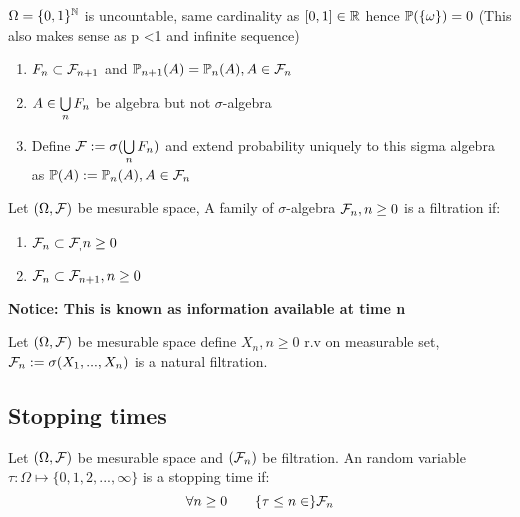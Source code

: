 \begin{rem}
$\Omega = \{0,1\}^{\mathbb{N}}$ is uncountable, same cardinality as $[0,1]\in\mathbb{R}$ hence $\mathbb{P}(\{\omega\}) = 0$ (This also makes sense as p <1 and infinite sequence)
\begin{enumerate}
    \item $F_n \subset \mathcal{F}_{n+1}$ and $\mathbb{P}_{n+1}(A)= \mathbb{P}_n(A), A\in \mathcal{F}_n$
    \item $A\in\bigcup\limits_{n}F_n$ be algebra but not $\sigma$-algebra
    \item Define $\mathcal{F} := \sigma(\bigcup\limits_{n}F_n)$ and extend probability uniquely to this sigma algebra as $\mathbb{P}(A) := \mathbb{P}_n(A), A\in\mathcal{F}_n$
\end{enumerate}
\end{rem}
\vspace{2cm}
\begin{dfn}[Filtration] Let $(\Omega, \mathcal{F})$ be mesurable space, A family of $\sigma$-algebra $\mathcal{F}_n, n\geq 0$ is a filtration if:
\begin{enumerate}
    \item $\mathcal{F}_n\subset\mathcal{F}_, n\geq 0$
    \item $\mathcal{F}_n \subset \mathcal{F}_{n+1}, n\geq 0$
\end{enumerate}
\end{dfn}
\textbf{Notice: This is known as information available at time n}
\begin{example}
Let $(\Omega, \mathcal{F})$ be mesurable space define $X_n, n\geq 0$ r.v on measurable set, $\mathcal{F}_n := \sigma(X_1, ..., X_n)$ is a natural filtration.
\end{example}

\newpage
\subsection*{Stopping times}
\begin{dfn}
Let $(\Omega, \mathcal{F})$ be mesurable space and $(\mathcal{F}_n)$ be filtration. An random variable $\tau: \Omega \mapsto \{0,1,2, ..., \infty\}$ is a stopping time if:
\begin{equation*}
    \forall n\geq 0 \qquad \{\tau \leq n \in \}\mathcal{F}_n
\end{equation*}
\end{dfn}

